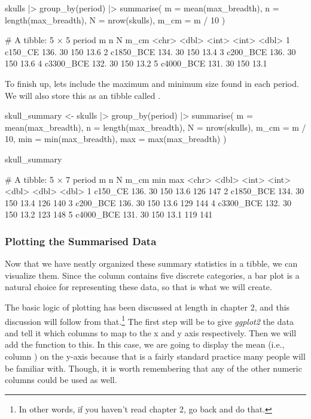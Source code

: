 \begin{inR}
skulls |> 
  group_by(period) |> 
  summarise(
    m = mean(max_breadth),
    n = length(max_breadth),
    N = nrow(skulls),
    m_cm = m / 10
    )
\end{inR}

\begin{outR}
# A tibble: 5 × 5
  period        m     n     N  m_cm
  <chr>     <dbl> <int> <int> <dbl>
1 c150_CE    136.    30   150  13.6
2 c1850_BCE  134.    30   150  13.4
3 c200_BCE   136.    30   150  13.6
4 c3300_BCE  132.    30   150  13.2
5 c4000_BCE  131.    30   150  13.1
\end{outR}


To finish up, lets include the maximum and minimum size found in each period. We will also store this as an tibble called .

\begin{inR}
skull_summary <- skulls |>
  group_by(period) |>
  summarise(
    m = mean(max_breadth),
    n = length(max_breadth),
    N = nrow(skulls),
    m_cm = m / 10,
    min = min(max_breadth),
    max = max(max_breadth)
  )\textbf{}

skull_summary
\end{inR}

\begin{outR}
# A tibble: 5 × 7
  period        m     n     N  m_cm   min   max
  <chr>     <dbl> <int> <int> <dbl> <dbl> <dbl>
1 c150_CE    136.    30   150  13.6   126   147
2 c1850_BCE  134.    30   150  13.4   126   140
3 c200_BCE   136.    30   150  13.6   129   144
4 c3300_BCE  132.    30   150  13.2   123   148
5 c4000_BCE  131.    30   150  13.1   119   141
\end{outR}

\subsubsection{Plotting the Summarised Data}

Now that we have neatly organized these summary statistics in a tibble, we can visualize them. Since the  column contains five discrete categories, a bar plot is a natural choice for representing these data, so that is what we will create.

The basic logic of plotting has been discussed at length in chapter 2, and this discussion will follow from that.\footnote{In other words, if you haven't read chapter 2, go back and do that.} The first step will be to give \textit{ggplot2} the data and tell it which columns to map to the x and y axis respectively. Then we will add the  function to this. In this case, we are going to display the mean (i.e., column ) on the y-axis because that is a fairly standard practice many people will be familiar with. Though, it is worth remembering that any of the other numeric columns could be used as well.

